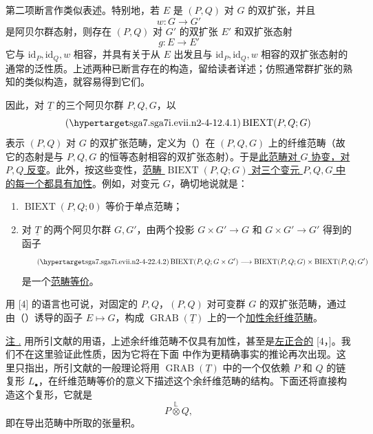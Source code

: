 第二项断言作类似表述。特别地，若 $E$ 是 $(P,Q)$ 对 $G$ 的双扩张，并且
\[
 w:G\longrightarrow G'
\]
是阿贝尔群态射，则存在 $(P,Q)$ 对 $G'$ 的双扩张 $E'$ 和双扩张态射
\[
 g:E\longrightarrow E'
\]
它与 $\mathrm{id}_P,\mathrm{id}_Q,w$ 相容，并具有关于从 $E$ 出发且与 $\mathrm{id}_P,\mathrm{id}_Q,w$ 相容的双扩张态射的通常的泛性质。上述两种已断言存在的构造，留给读者详述；仿照通常群扩张的熟知的类似构造，就容易得到它们。

因此，对 $\underline T$ 的三个阿贝尔群 $P,Q,G$，以
\begin{equation}\tag{\SGARefTarget{sga7.sga7i.evii.n2-4-1}{2.4.1}}
 \operatorname{BIEXT}(P,Q;G)
\end{equation}
表示 $(P,Q)$ 对 $G$ 的双扩张范畴，定义为（）在 $(P,Q,G)$ 上的纤维范畴（故它的态射是与 $P,Q,G$ 的恒等态射相容的双扩张态射）。于是\underline{此范畴对 $G$ 协变，对 $P,Q$ 反变}。此外，按这些变性，\underline{范畴 $\operatorname{BIEXT}(P,Q;G)$ 对三个变元 $P,Q,G$ 中的每一个都具有加性}。例如，对变元 $G$，确切地说就是：

\begin{enumerate}[label=\alph*)]
\item $\operatorname{BIEXT}(P,Q;0)$ 等价于单点范畴；
\item 对 $\underline T$ 的两个阿贝尔群 $G,G'$，由两个投影 $G\times G'\longrightarrow G$ 和 $G\times G'\longrightarrow G'$ 得到的函子
\begin{equation}\tag{\SGARefTarget{sga7.sga7i.evii.n2-4-2}{2.4.2}}
 \operatorname{BIEXT}(P,Q;G\times G')
 \longrightarrow
 \operatorname{BIEXT}(P,Q;G)\times
 \operatorname{BIEXT}(P,Q;G')
\end{equation}
是一个\underline{范畴等价}。
\end{enumerate}
用 [4] 的语言也可说，对固定的 $P,Q$，$(P,Q)$ 对可变群 $G$ 的双扩张范畴，通过由（）诱导的函子 $E\mapsto G$，构成 $\operatorname{GRAB}(\underline T)$ 上的一个\underline{加性余纤维范畴}。

\underline{注 .} 用所引文献的用语，上述余纤维范畴不仅具有加性，甚至是\underline{左正合的} [4，]。我们不在这里验证此性质，因为它将在下面  中作为更精确事实的推论再次出现。这里只指出，所引文献的一般理论将用 $\operatorname{GRAB}(\underline T)$ 中的一个仅依赖 $P$ 和 $Q$ 的链复形 $L_\bullet$，在纤维范畴等价的意义下描述这个余纤维范畴的结构。下面还将直接构造这个复形，它就是
\[
 P\overset{\mathbb L}{\otimes}Q,
\]
即在导出范畴中所取的张量积。


